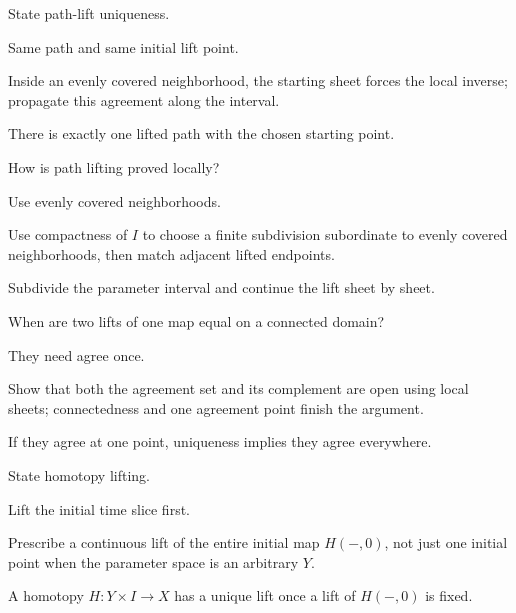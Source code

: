 \begin{exercise}\label{exr:viii11-03}
State path-lift uniqueness.
\end{exercise}
\begin{hint}
Same path and same initial lift point.

Inside an evenly covered neighborhood, the starting sheet forces the local inverse; propagate this agreement along the interval.
\end{hint}
\begin{solution}
There is exactly one lifted path with the chosen starting point.
\end{solution}

\begin{exercise}\label{exr:viii11-04}
How is path lifting proved locally?
\end{exercise}
\begin{hint}
Use evenly covered neighborhoods.

Use compactness of \(I\) to choose a finite subdivision subordinate to evenly covered neighborhoods, then match adjacent lifted endpoints.
\end{hint}
\begin{solution}
Subdivide the parameter interval and continue the lift sheet by sheet.
\end{solution}

\begin{exercise}\label{exr:viii11-05}
When are two lifts of one map equal on a connected domain?
\end{exercise}
\begin{hint}
They need agree once.

Show that both the agreement set and its complement are open using local sheets; connectedness and one agreement point finish the argument.
\end{hint}
\begin{solution}
If they agree at one point, uniqueness implies they agree everywhere.
\end{solution}

\begin{exercise}\label{exr:viii11-06}
State homotopy lifting.
\end{exercise}
\begin{hint}
Lift the initial time slice first.

Prescribe a continuous lift of the entire initial map \(H(-,0)\), not just one initial point when the parameter space is an arbitrary \(Y\).
\end{hint}
\begin{solution}
A homotopy \(H:Y\times I\to X\) has a unique lift once a lift of \(H(-,0)\) is fixed.
\end{solution}

